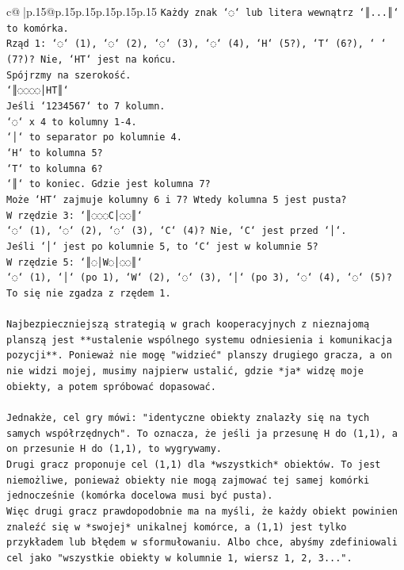 \documentclass{article}
\begin{document}
{\begin{supertabular}{c@{$\;$}|p{.15\linewidth}@{}p{.15\linewidth}p{.15\linewidth}p{.15\linewidth}p{.15\linewidth}p{.15\linewidth}}
{{{\texttt{Każdy znak `◌` lub litera wewnątrz `║...║` to komórka.} \\
\texttt{Rząd 1: `◌` (1), `◌` (2), `◌` (3), `◌` (4), `H` (5?), `T` (6?), ` ` (7?)? Nie, `HT` jest na końcu.} \\
\texttt{Spójrzmy na szerokość.} \\
\texttt{`║◌◌◌◌│HT║`} \\
\texttt{Jeśli `1234567` to 7 kolumn.} \\
\texttt{`◌` x 4 to kolumny 1{-}4.} \\
\texttt{`│` to separator po kolumnie 4.} \\
\texttt{`H` to kolumna 5?} \\
\texttt{`T` to kolumna 6?} \\
\texttt{`║` to koniec. Gdzie jest kolumna 7?} \\
\texttt{Może `HT` zajmuje kolumny 6 i 7? Wtedy kolumna 5 jest pusta?} \\
\texttt{W rzędzie 3: `║◌◌◌C│◌◌║`} \\
\texttt{`◌` (1), `◌` (2), `◌` (3), `C` (4)? Nie, `C` jest przed `│`.} \\
\texttt{Jeśli `│` jest po kolumnie 5, to `C` jest w kolumnie 5?} \\
\texttt{W rzędzie 5: `║◌│W◌│◌◌║`} \\
\texttt{`◌` (1), `│` (po 1), `W` (2), `◌` (3), `│` (po 3), `◌` (4), `◌` (5)?} \\
\texttt{To się nie zgadza z rzędem 1.} \\
\\ 
\texttt{Najbezpieczniejszą strategią w grach kooperacyjnych z nieznajomą planszą jest **ustalenie wspólnego systemu odniesienia i komunikacja pozycji**. Ponieważ nie mogę "widzieć" planszy drugiego gracza, a on nie widzi mojej, musimy najpierw ustalić, gdzie *ja* widzę moje obiekty, a potem spróbować dopasować.} \\
\\ 
\texttt{Jednakże, cel gry mówi: "identyczne obiekty znalazły się na tych samych współrzędnych". To oznacza, że jeśli ja przesunę H do (1,1), a on przesunie H do (1,1), to wygrywamy.} \\
\texttt{Drugi gracz proponuje cel (1,1) dla *wszystkich* obiektów. To jest niemożliwe, ponieważ obiekty nie mogą zajmować tej samej komórki jednocześnie (komórka docelowa musi być pusta).} \\
\texttt{Więc drugi gracz prawdopodobnie ma na myśli, że każdy obiekt powinien znaleźć się w *swojej* unikalnej komórce, a (1,1) jest tylko przykładem lub błędem w sformułowaniu. Albo chce, abyśmy zdefiniowali cel jako "wszystkie obiekty w kolumnie 1, wiersz 1, 2, 3...".} \\
}}}
\end{supertabular}}
\end{document}
